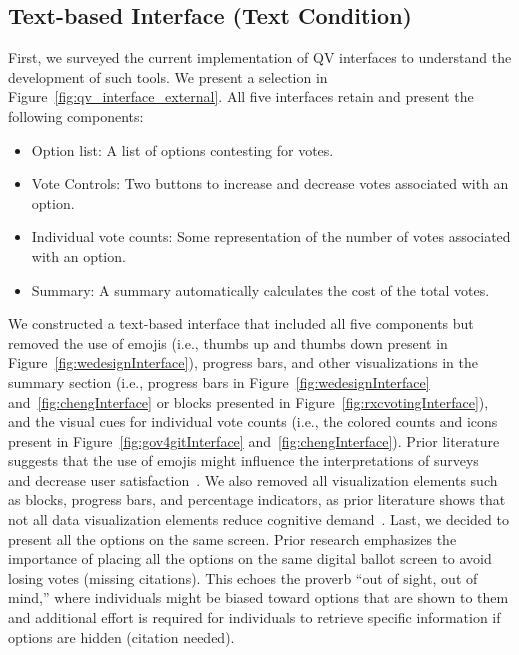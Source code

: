 \subsection{Text-based Interface (Text Condition)}
First, we surveyed the current implementation of QV interfaces to understand the development of such tools. We present a selection in Figure~\ref{fig:qv_interface_external}. All five interfaces retain and present the following components:
\begin{itemize}
    \item Option list: A list of options contesting for votes.
    \item Vote Controls: Two buttons to increase and decrease votes associated with an option.
    \item Individual vote counts: Some representation of the number of votes associated with an option.
    \item Summary: A summary automatically calculates the cost of the total votes.
\end{itemize}

We constructed a text-based interface that included all five components but removed the use of emojis (i.e., thumbs up and thumbs down present in Figure~\ref{fig:wedesignInterface}), progress bars, and other visualizations in the summary section (i.e., progress bars in Figure~\ref{fig:wedesignInterface} and~\ref{fig:chengInterface} or blocks presented in Figure~\ref{fig:rxcvotingInterface}), and the visual cues for individual vote counts (i.e., the colored counts and icons present in Figure~\ref{fig:gov4gitInterface} and~\ref{fig:chengInterface}). Prior literature suggests that the use of emojis might influence the interpretations of surveys~\cite{herringGenderAgeInfluences2020} and decrease user satisfaction~\cite{toepoelSmileysStarsHearts2019}. We also removed all visualization elements such as blocks, progress bars, and percentage indicators, as prior literature shows that not all data visualization elements reduce cognitive demand~\cite{huangMeasuringEffectivenessGraph2009a}. Last, we decided to present all the options on the same screen. Prior research emphasizes the importance of placing all the options on the same digital ballot screen to avoid losing votes (missing citations). This echoes the proverb ``out of sight, out of mind,'' where individuals might be biased toward options that are shown to them and additional effort is required for individuals to retrieve specific information if options are hidden (citation needed).

